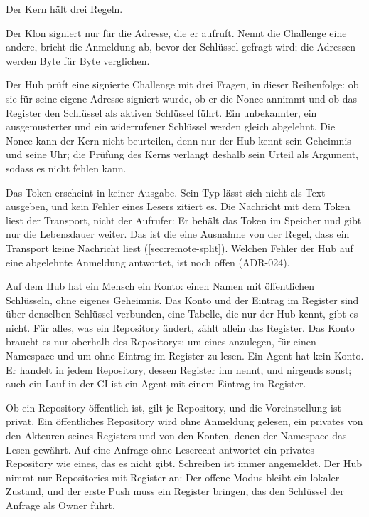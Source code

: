Der Kern hält drei Regeln.
\startitemize
\item Der Klon signiert nur für die Adresse, die er aufruft.
Nennt die Challenge eine andere, bricht die Anmeldung ab, bevor der Schlüssel gefragt wird; die
Adressen werden Byte für Byte verglichen.
\item Der Hub prüft eine signierte Challenge mit drei Fragen, in dieser Reihenfolge: ob sie für
seine eigene Adresse signiert wurde, ob er die Nonce annimmt und ob das Register den Schlüssel
als aktiven Schlüssel führt.
Ein unbekannter, ein ausgemusterter und ein widerrufener Schlüssel werden gleich abgelehnt.
Die Nonce kann der Kern nicht beurteilen, denn nur der Hub kennt sein Geheimnis und seine Uhr;
die Prüfung des Kerns verlangt deshalb sein Urteil als Argument, sodass es nicht fehlen kann.
\item Das Token erscheint in keiner Ausgabe.
Sein Typ lässt sich nicht als Text ausgeben, und kein Fehler eines Lesers zitiert es.
Die Nachricht mit dem Token liest der Transport, nicht der Aufrufer: Er behält das Token im
Speicher und gibt nur die Lebensdauer weiter.
Das ist die eine Ausnahme von der Regel, dass ein Transport keine Nachricht liest
([sec:remote-split]).
\stopitemize
Welchen Fehler der Hub auf eine abgelehnte Anmeldung antwortet, ist noch offen (ADR-024).

Auf dem Hub hat ein Mensch ein Konto: einen Namen mit öffentlichen Schlüsseln, ohne eigenes
Geheimnis.
Das Konto und der Eintrag im Register sind über denselben Schlüssel verbunden, eine Tabelle, die
nur der Hub kennt, gibt es nicht.
Für alles, was ein Repository ändert, zählt allein das Register.
Das Konto braucht es nur oberhalb des Repositorys: um eines anzulegen, für einen Namespace und um
ohne Eintrag im Register zu lesen.
Ein Agent hat kein Konto.
Er handelt in jedem Repository, dessen Register ihn nennt, und nirgends sonst; auch ein Lauf in
der CI ist ein Agent mit einem Eintrag im Register.

Ob ein Repository öffentlich ist, gilt je Repository, und die Voreinstellung ist privat.
Ein öffentliches Repository wird ohne Anmeldung gelesen, ein privates von den Akteuren seines
Registers und von den Konten, denen der Namespace das Lesen gewährt.
Auf eine Anfrage ohne Leserecht antwortet ein privates Repository wie eines, das es nicht gibt.
Schreiben ist immer angemeldet.
Der Hub nimmt nur Repositories mit Register an: Der offene Modus bleibt ein lokaler Zustand, und
der erste Push muss ein Register bringen, das den Schlüssel der Anfrage als Owner führt.

